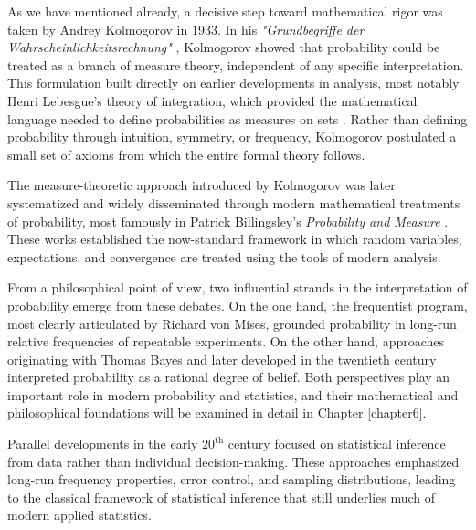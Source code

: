 \medskip

As we have mentioned already, a decisive step toward mathematical rigor was taken by Andrey Kolmogorov in 1933. In his \textit{"Grundbegriffe der Wahrscheinlichkeitsrechnung"} \cite{kolmogorov_1933_grundbegriffe}, Kolmogorov showed that probability could be treated as a branch of measure theory, independent of any specific interpretation. This formulation built directly on earlier developments in analysis, most notably Henri Lebesgue’s theory of integration, which provided the mathematical language needed to define probabilities as measures on sets \cite{lebesgue_1902_integrale}. Rather than defining probability through intuition, symmetry, or frequency, Kolmogorov postulated a small set of axioms from which the entire formal theory follows.

\medskip

The measure-theoretic approach introduced by Kolmogorov was later systematized and widely disseminated through modern mathematical treatments of probability, most famously in Patrick Billingsley’s \textit{Probability and Measure} \cite{billingsley_1995_measure}. These works established the now-standard framework in which random variables, expectations, and convergence are treated using the tools of modern analysis.

\medskip

From a philosophical point of view, two influential strands in the interpretation of probability emerge from these debates. On the one hand, the frequentist program, most clearly articulated by Richard von Mises, grounded probability in long-run relative frequencies of repeatable experiments. On the other hand, approaches originating with Thomas Bayes and later developed in the twentieth century interpreted probability as a rational degree of belief. Both perspectives play an important role in modern probability and statistics, and their mathematical and philosophical foundations will be examined in detail in Chapter \ref{chapter6}.

\medskip

Parallel developments in the early $20^{\text{th}}$ century focused on statistical inference from data rather than individual decision-making. These approaches emphasized long-run frequency properties, error control, and sampling distributions, leading to the classical framework of statistical inference that still underlies much of modern applied statistics.

